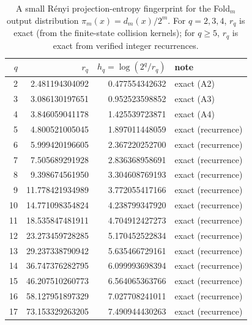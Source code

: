 \begin{table}[H]
\centering
\scriptsize
\setlength{\tabcolsep}{6pt}
\caption{A small R\'enyi projection-entropy fingerprint for the Fold$_m$ output distribution $\pi_m(x)=d_m(x)/2^m$. For $q=2,3,4$, $r_q$ is exact (from the finite-state collision kernels); for $q\ge 5$, $r_q$ is exact from verified integer recurrences.}
\label{tab:fold_collision_renyi_spectrum}
\begin{tabular}{r r r l}
\toprule
$q$ & $r_q$ & $h_q=\log(2^q/r_q)$ & note\\
\midrule
2 & 2.481194304092 & 0.477554342632 & exact (A2)\\
3 & 3.086130197651 & 0.952523598852 & exact (A3)\\
4 & 3.846059041178 & 1.425539723871 & exact (A4)\\
5 & 4.800521005045 & 1.897011448059 & exact (recurrence)\\
6 & 5.999420196605 & 2.367220252700 & exact (recurrence)\\
7 & 7.505689291928 & 2.836368958691 & exact (recurrence)\\
8 & 9.398674561950 & 3.304608769193 & exact (recurrence)\\
9 & 11.778421934989 & 3.772055417166 & exact (recurrence)\\
10 & 14.771098354824 & 4.238799347920 & exact (recurrence)\\
11 & 18.535847481911 & 4.704912427273 & exact (recurrence)\\
12 & 23.273459728285 & 5.170452522834 & exact (recurrence)\\
13 & 29.237338790942 & 5.635466729161 & exact (recurrence)\\
14 & 36.747376282795 & 6.099993698394 & exact (recurrence)\\
15 & 46.207510260773 & 6.564065363766 & exact (recurrence)\\
16 & 58.127951897329 & 7.027708241011 & exact (recurrence)\\
17 & 73.153329263205 & 7.490944430263 & exact (recurrence)\\
\bottomrule
\end{tabular}
\end{table}
